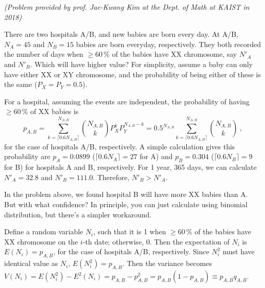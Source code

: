 \begin{ex}
\textit{(Problem provided by prof. Jae-Kwang Kim at the Dept. of Math at KAIST in 2018)}

There are two hospitals A/B, and new babies are born every day. At A/B, $ N_A = 45 $ and $ N_B = 15 $ babies are born everyday, respectively. They both recorded the number of days when $ \ge 60\,\% $ of the babies have XX chromosome, say $ N'_A $ and $ N'_B $. Which will have higher value? For simplicity, assume a baby can only have either XX or XY chromosome, and the probability of being either of these is the same ($ P_X = P_Y = 0.5 $).

For a hospital, assuming the events are independent, the probability of having $ \ge 60\,\% $ of XX babies is
\begin{equation*}
  p_{A, B} 
    = \sum_{k= \lceil 0.6N_{A, B} \rceil}^{N_{A, B}} \binom{N_{A, B}}{k} P_X^k P_Y^{N_{A, B}-k}
    = 0.5^{N_{A, B}} \sum_{k= \lceil 0.6N_{A, B} \rceil}^{N_{A, B}} \binom{N_{A, B}}{k} ~,
\end{equation*}
for the case of hospitals A/B, respectively. A simple calculation gives this probability are $ p_A = 0.0899 $ ($ \lceil 0.6N_A \rceil = 27 $ for A) and $ p_B = 0.304 $ ($ \lceil 0.6N_B \rceil = 9 $ for B) for hospitals A and B, respectively. For 1 year, 365 days, we can calculate $ N'_A = 32.8 $ and $ N'_B = 111.0 $. Therefore, $ N'_B > N'_A $. 
\end{ex}

In the problem above, we found hospital B will have more XX babies than A. But with what confidence? In principle, you can just calculate using binomial distribution, but there's a simpler workaround.

Define a random variable $ N_i $, such that it is 1 when $ \ge 60\,\% $ of the babies have XX chromosome on the $ i $-th date; otherwise, 0. Then the expectation of $ N_i $ is $ E(N_i) = p_{A, B} $, for the case of hospitals A/B, respectively. Since $ N_i^2 $ must have identical value as $ N_i $, $ E(N_i^2) = p_{A, B} $. Then the variance becomes $ V(N_i) = E(N_i^2) - E^2(N_i) = p_{A, B} - p_{A, B}^2 = p_{A, B}(1 - p_{A, B}) \equiv p_{A, B} q_{A, B} $.

